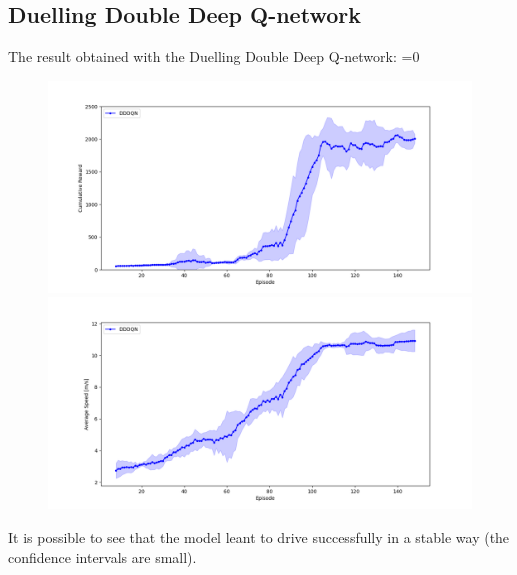 \documentclass[14pt]{extarticle}
\def\sp{\vspace{5pt}}
\newcounter{debug}
\begin{document}
\begin{flushleft}
\subsection{Duelling Double Deep Q-network}
\sp
The result obtained with the Duelling Double Deep Q-network:
\vspace{-5mm}
\ifnum\value{debug}=0 {
	\begin{figure}[H]
    		\centering\includegraphics[width=1\textwidth]{./Image/Results/DDD/plot2_reward.png}
    		\vspace{-5mm}
    		\centering\includegraphics[width=1\textwidth]{./Image/Results/DDD/plot2_speed.png}
	\end{figure}
	}\fi
	It is possible to see that the model leant to drive successfully in a stable way (the confidence intervals are small).
	

\end{flushleft}
\end{document}
